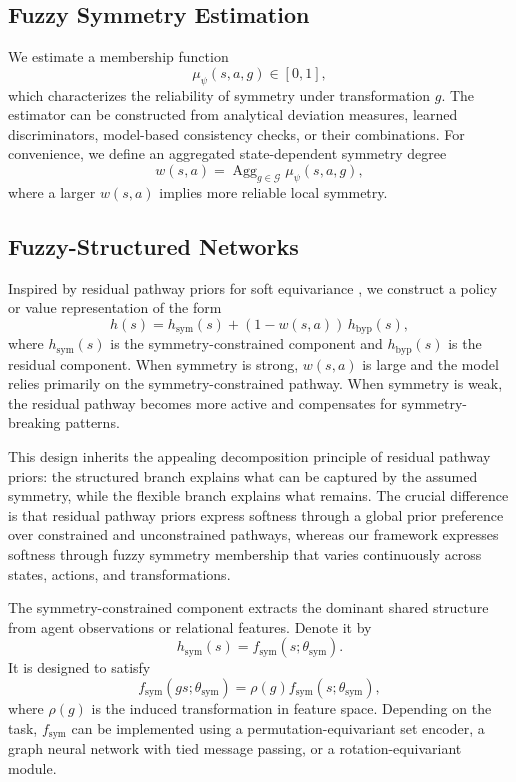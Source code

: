 \documentclass[lettersize,journal]{IEEEtran}
\newcommand{\Acal}{\mathcal}
\newcommand{\sym}{\mathrm{sym}}
\newcommand{\bypass}{\mathrm{byp}}
\begin{document}
\subsection{Fuzzy Symmetry Estimation}
We estimate a membership function
\[
\mu_\psi(s,a,g)\in[0,1],
\]
which characterizes the reliability of symmetry under transformation $g$. The estimator can be constructed from analytical deviation measures, learned discriminators, model-based consistency checks, or their combinations. For convenience, we define an aggregated state-dependent symmetry degree
\begin{equation}
w(s,a)=\operatorname{Agg}_{g\in\Acal{G}} \mu_\psi(s,a,g),
\label{eq:w}
\end{equation}
where a larger $w(s,a)$ implies more reliable local symmetry.

\subsection{Fuzzy-Structured Networks}
Inspired by residual pathway priors for soft equivariance \cite{finzi2021rpp}, we construct a policy or value representation of the form
\begin{equation}
h(s)=h_{\sym}(s)+(1-w(s,a))\,h_{\bypass}(s),
\label{eq:fusion}
\end{equation}
where $h_{\sym}(s)$ is the symmetry-constrained component and $h_{\bypass}(s)$ is the residual component. When symmetry is strong, $w(s,a)$ is large and the model relies primarily on the symmetry-constrained pathway. When symmetry is weak, the residual pathway becomes more active and compensates for symmetry-breaking patterns.

This design inherits the appealing decomposition principle of residual pathway priors: the structured branch explains what can be captured by the assumed symmetry, while the flexible branch explains what remains. The crucial difference is that residual pathway priors express softness through a global prior preference over constrained and unconstrained pathways, whereas our framework expresses softness through fuzzy symmetry membership that varies continuously across states, actions, and transformations.

The symmetry-constrained component extracts the dominant shared structure from agent observations or relational features. Denote it by
\[
h_{\sym}(s)=f_{\sym}(s;\theta_{\sym}).
\]
It is designed to satisfy
\begin{equation}
f_{\sym}(gs;\theta_{\sym}) = \rho(g)f_{\sym}(s;\theta_{\sym}),
\label{eq:eq_branch}
\end{equation}
where $\rho(g)$ is the induced transformation in feature space. Depending on the task, $f_{\sym}$ can be implemented using a permutation-equivariant set encoder, a graph neural network with tied message passing, or a rotation-equivariant module.
\end{document}
